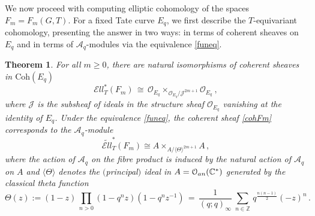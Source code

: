 \documentclass[11pt]{amsart}
\newtheorem{theorem}{Theorem}[section]
\theoremstyle{definition}
\theoremstyle{remark}
\numberwithin{equation}{section}
\newcommand{\la}{\label}
\def\c{\mathbb{C}}
\def\A{\mathcal{A}}
\def\Z{\mathbb{Z}}
\def\O{\mathcal{O}}
\def\Ell{\mathcal{E}{ll}}
\def\Coh{\mathrm{Coh}}
\begin{document}
We now proceed with computing elliptic cohomology of the spaces $ F_m = F_m(G,T) $.
For a fixed Tate curve $ E_q $, we first describe the $T$-equivariant cohomology,
presenting the answer in two ways: in terms of coherent sheaves on $E_q$ and 
in terms of $\A_q$-modules via the equivalence \eqref{funeq}.
%
\begin{theorem}
\la{ThTell}
For all $m\ge0$, there are natural isomorphisms of coherent sheaves in $ \Coh(E_q)$
%
\begin{equation}\la{cohFm}
\Ell_T^*(F_m)\,\cong\, \O_{E_q} \times_{\O_{E_q}/{\mathcal J}^{2m+1}} \O_{E_q}\ ,    
\end{equation}
%
where $ {\mathcal J} $ is the subsheaf of ideals in the structure sheaf $ \O_{E_q}$ vanishing at
the identity of $ E_q $. Under the equivalence \eqref{funeq}, the coherent
sheaf \eqref{cohFm} corresponds to the $\A_q$-module
%
\begin{equation}
\la{cohFm1}
\widetilde{\Ell}_T^*(F_m) \cong A \times_{A/\langle\Theta\rangle^{2m+1}} A \,,   
\end{equation}
%
where the action of $\A_q $ on the fibre product is induced by the natural action of $\A_q$ on $A$
and $ \langle \Theta\rangle $ denotes the $($principal$)$ ideal in $ A = \O_{\rm an}(\c^*) $ generated by the classical theta function
%
\begin{equation}
\la{Theta}
\Theta(z) :=  (1-z)\,\prod_{n>0}(1-q^n z)(1-q^{n}z^{-1})\,=\, \frac{1}{(q;q)_{\infty}} \ \sum_{n \in \Z}\, q^{\frac{n(n-1)}{2}} (-z)^n 
\,.
\end{equation}
\end{theorem}
%
\end{document}
